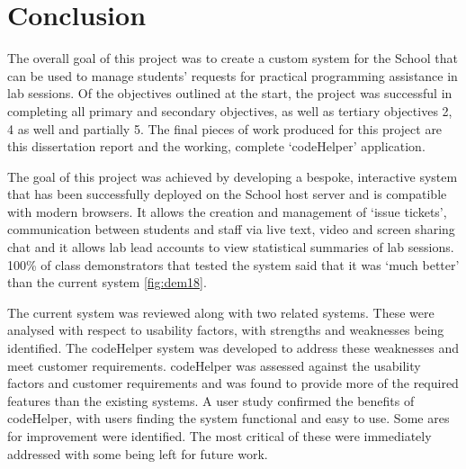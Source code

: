 \chapter{Conclusion}

The overall goal of this project was to create a custom system for the School that can be used to manage students’ requests for practical programming assistance in lab sessions. Of the objectives outlined at the start, the project was successful in completing all primary and secondary objectives, as well as tertiary objectives 2, 4 as well and partially 5. The final pieces of work produced for this project are this dissertation report and the working, complete `codeHelper' application.

The goal of this project was achieved by developing a bespoke, interactive system that has been successfully deployed on the School host server and is compatible with modern browsers. It allows the creation and management of `issue tickets', communication between students and staff via live text, video and screen sharing chat and it allows lab lead accounts to view statistical summaries of lab sessions. 100\% of class demonstrators that tested the system said that it was `much better' than the current system \ref{fig:dem18}.

\begin{comment}
This dissertation discussed the work that was involved in producing the `codeHelper' application. Firstly, the dissertation introduces the context for the project - the history of lab management, current situation with regards to the global pandemic and the motives for developing a new system. Secondly, a study of related work was carried out to gather evidence and inspiration for the new system in question. Then, the requirements of the system were outlined before a discussion of the design, implementation, testing and software engineering processes. Finally, the system was evaluated by the product owner/customer and by volunteering students and class demonstrators.
\end{comment}

The current system was reviewed along with two related systems. These were analysed with respect to usability factors, with strengths and weaknesses being identified. The codeHelper system was developed to address these weaknesses and meet customer requirements. codeHelper was assessed against the usability factors and customer requirements and was found to provide more of the required features than the existing systems. A user study confirmed the benefits of codeHelper, with users finding the system functional and easy to use. Some ares for improvement were identified. The most critical of these were immediately addressed with some being left for future work.

